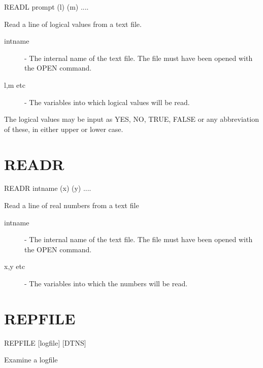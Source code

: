 \documentclass[twoside,11pt]{report}
\newcommand{\xlabel}[1]{}
\begin{document}
    READL \hspace{.5cm} prompt \hspace{.5cm} (l) \hspace{.5cm} (m)  ....

 Read a line of logical values from a text file.

\begin{description}

\item[intname]  -  The internal name of the text file. The file must have
                   been opened with the OPEN command.

\item[l,m etc] -  The variables into which logical values will be read.

\end{description}
The logical values may be input as YES, NO, TRUE, FALSE or any
abbreviation of these, in either upper or lower case.


\section{\xlabel{READR}READR\label{READR}}

    READR \hspace{.5cm} intname \hspace{.5cm} (x) \hspace{.5cm} (y)  ....

 Read a line of real numbers from a text file

\begin{description}

\item[intname]  -  The internal name of the text file. The file must have
                   been opened with the OPEN command.

\item[x,y etc] -  The variables into which the numbers will be read.

\end{description}


\section{\xlabel{REPFILE}REPFILE\label{REPFILE}}

    REPFILE \hspace{.5cm} [logfile] \hspace{.5cm} [DTNS]

Examine a logfile
\end{document}
